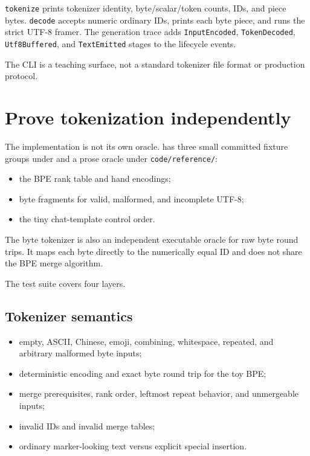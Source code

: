 \texttt{tokenize} prints tokenizer identity, byte/scalar/token counts,
IDs, and piece bytes. \texttt{decode} accepts numeric ordinary IDs,
prints each byte piece, and runs the strict UTF-8 framer. The generation
trace adds \texttt{InputEncoded}, \texttt{TokenDecoded},
\texttt{Utf8Buffered}, and \texttt{TextEmitted} stages to the 
lifecycle events.

The CLI is a teaching surface, not a standard tokenizer file format or
production protocol.

\section{Prove tokenization
independently}\label{prove-tokenization-independently}

The implementation is not its own oracle.  has three small
committed fixture groups under
\texttt{} and a prose
oracle under \texttt{code/reference/}:

\begin{itemize}
\tightlist
\item
  the BPE rank table and hand encodings;
\item
  byte fragments for valid, malformed, and incomplete UTF-8;
\item
  the tiny chat-template control order.
\end{itemize}

The byte tokenizer is also an independent executable oracle for raw byte
round trips. It maps each byte directly to the numerically equal ID and
does not share the BPE merge algorithm.

The test suite covers four layers.

\subsection{Tokenizer semantics}\label{tokenizer-semantics}

\begin{itemize}
\tightlist
\item
  empty, ASCII, Chinese, emoji, combining, whitespace, repeated, and
  arbitrary malformed byte inputs;
\item
  deterministic encoding and exact byte round trip for the toy BPE;
\item
  merge prerequisites, rank order, leftmost repeat behavior, and
  unmergeable inputs;
\item
  invalid IDs and invalid merge tables;
\item
  ordinary marker-looking text versus explicit special insertion.
\end{itemize}

